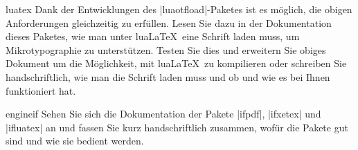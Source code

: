 \documentclass[
	blatt=11,
	ausgabe=25.\,06.\,2010,
	rückgabe=02.\,07.\,2010
]{lcourse-hd}
\begin{document}
\begin{expertexercise}[
  name=Wunderwaffe,
  abgabe = Quelltext per Mail{,} das fertige Dokument als Ausdruck.
]{luatex}
Dank der Entwicklungen des |luaotfload|-Paketes ist es möglich, die obigen Anforderungen gleichzeitig zu erfüllen. Lesen Sie dazu in der Dokumentation dieses Paketes, wie man unter lua\LaTeX\ eine Schrift laden muss, um Mikrotypographie zu unterstützen. Testen Sie dies und erweitern Sie obiges Dokument um die Möglichkeit, mit lua\LaTeX\ zu kompilieren oder schreiben Sie handschriftlich, wie man die Schrift laden muss und ob und wie es bei Ihnen funktioniert hat.

\end{expertexercise}

\begin{exercise}[
  name=Maschinenfragen,
  punkte=3,
  abgabe = Handschriftliche Zusammenfassung der Paketdokumentationen.
]{engineif}
Sehen Sie sich die Dokumentation der Pakete |ifpdf|, |ifxetex| und |ifluatex| an und fassen Sie kurz handschriftlich zusammen, wofür die Pakete gut sind und wie sie bedient werden.
\end{exercise}
\end{document}
